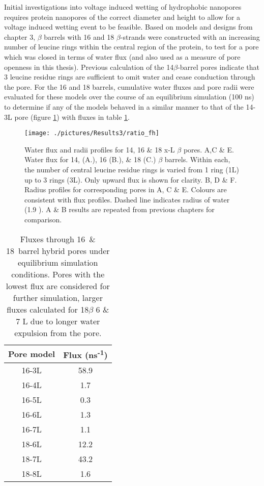 Initial investigations into voltage induced wetting of hydrophobic nanopores requires protein nanopores of the correct diameter and height to allow for a voltage induced wetting event to be feasible. Based on models and designs from chapter 3, $\beta$ barrels with 16 and 18 $\beta$-strands were constructed with an increasing number of leucine rings within the central region of the protein, to test for a pore which was closed in terms of water flux (and also used as a measure of pore openness in this thesis). Previous calculation of the 14$\beta$-barrel pores indicate that 3 leucine residue rings are sufficient to omit water and cease conduction through the pore. For the 16 and 18 barrels, cumulative water fluxes and pore radii were evaluated for these models over the course of an equilibrium simulation (100 ns) to determine if any of the models behaved in a similar manner to that of the 14-3L pore (figure \ref{fig:ratio_fh}) with fluxes in table \ref{table:fluxes1}. 

\begin{figure}[H]
\begin{center}
\texttt{[image: ./pictures/Results3/ratio\_fh]}
\caption[Water flux and radii profiles for 14, 16 \& 18 x-L $\beta$ pores.] {Water flux and radii profiles for 14, 16 \& 18 x-L $\beta$ pores. A,C \& E. Water flux for 14, (A.), 16 (B.), \& 18 (C.) $\beta$ barrels. Within each, the number of central leucine residue rings is varied from 1 ring (1L) up to 3 rings (3L). Only upward flux is shown for clarity. B, D \& F. Radius profiles for corresponding pores in A, C \& E. Colours are consistent with flux profiles. Dashed line indicates radius of water (1.9 \angstrom). A \& B results are repeated from previous chapters for comparison.}
\label{fig:ratio_fh}
\end{center}
\end{figure}

\begin{table}[H]
\centering %
\begin{tabular}{ |c|c| } 
 \hline
 Pore model & Flux (ns\textsuperscript{-1}) \\  
 \hline
 16-3L & 58.9  \\
 16-4L & 1.7  \\
 16-5L & 0.3  \\
 16-6L & 1.3  \\
 16-7L & 1.1  \\
 \hline
 18-6L & 12.2  \\
 18-7L & 43.2  \\
 18-8L & 1.6  \\
 \hline
 \end{tabular}
\caption[Fluxes through 16\bee\ \& 18\bee\ barrel hybrid pores.] {Fluxes through 16\bee\ \& 18\bee\ barrel hybrid pores under equilibrium simulation conditions. Pores with the lowest flux are considered for further simulation, larger fluxes calculated for 18$\beta$ 6 \& 7 L due to longer water expulsion from the pore. }
\label{table:fluxes1}
\end{table}

